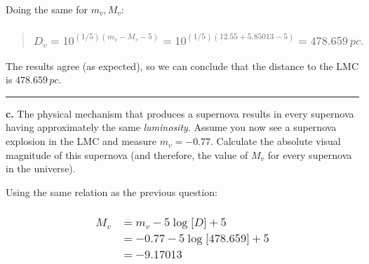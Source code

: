 \documentclass[
]{article}
\begin{document}
Doing the same for {\(m_{v},M_{v}\)}:

\begin{quote}
\hypertarget{d_v-1015m_v---m_v---5-101512.55-5.85013---5-478.659-pc.}{%
\subsubsection{\texorpdfstring{{\[D_{v} = 10^{(1/5)(m_{v} - M_{v} - 5)} = 10^{(1/5)(12.55 + 5.85013 - 5)} = 478.659\, pc.\]}}{D\_\{v\} = 10\^{}\{(1/5)(m\_\{v\} - M\_\{v\} - 5)\} = 10\^{}\{(1/5)(12.55 + 5.85013 - 5)\} = 478.659\textbackslash, pc.}}\label{d_v-1015m_v---m_v---5-101512.55-5.85013---5-478.659-pc.}}
\end{quote}

The results agree (as expected), so we can conclude that the distance to
the LMC is {\(478.659\, pc.\)}

\begin{center}\rule{0.5\linewidth}{0.5pt}\end{center}

\textbf{c.} The physical mechanism that produces a supernova results in
every supernova having approximately the same \emph{luminosity}. Assume
you now see a supernova explosion in the LMC and measure
{\(m_{v} = - 0.77\)}. Calculate the absolute visual magnitude of this
supernova (and therefore, the value of {\(M_{v}\)} for every supernova
in the universe).

Using the same relation as the previous question:

\hypertarget{beginmatrix-m_v-m_v---5loglbrack-drbrack-5---0.77---5loglbrack-478.659rbrack-5---9.17013-endmatrix}{%
\subsubsection{\texorpdfstring{{\[\begin{matrix}
M_{v} & {= m_{v} - 5\log\lbrack D\rbrack + 5} \\
 & {= - 0.77 - 5\log\lbrack 478.659\rbrack + 5} \\
 & {= - 9.17013} \\
\end{matrix}\]}}{\textbackslash begin\{matrix\}
M\_\{v\} \& \{= m\_\{v\} - 5\textbackslash log\textbackslash lbrack D\textbackslash rbrack + 5\} \textbackslash\textbackslash{}
 \& \{= - 0.77 - 5\textbackslash log\textbackslash lbrack 478.659\textbackslash rbrack + 5\} \textbackslash\textbackslash{}
 \& \{= - 9.17013\} \textbackslash\textbackslash{}
\textbackslash end\{matrix\}}}\label{beginmatrix-m_v-m_v---5loglbrack-drbrack-5---0.77---5loglbrack-478.659rbrack-5---9.17013-endmatrix}}
\end{document}
